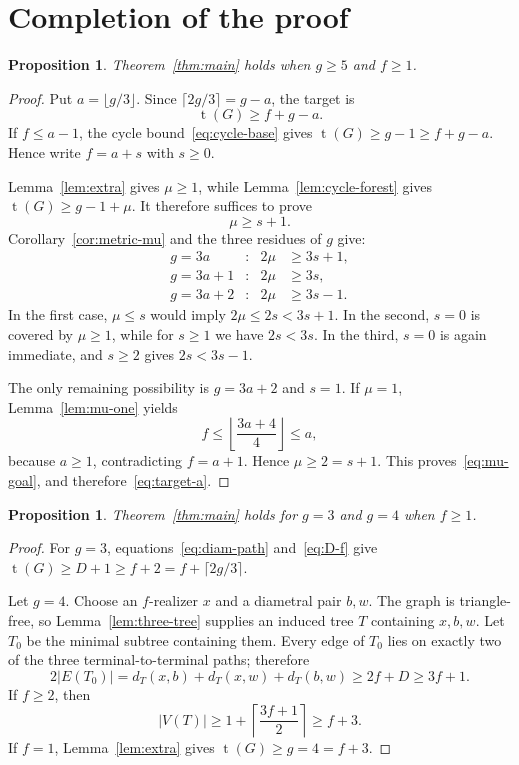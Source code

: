 \documentclass[11pt]{article}
\numberwithin{equation}{section}
\newtheorem{proposition}[theorem]{Proposition}
\theoremstyle{remark}
\newcommand{\tr}{\operatorname{t}}
\begin{document}
\section{Completion of the proof}

\begin{proposition}\label{prop:large-girth}
Theorem~\ref{thm:main} holds when $g\ge5$ and $f\ge1$.
\end{proposition}

\begin{proof}
Put $a=\lfloor g/3\rfloor$.  Since
$\lceil2g/3\rceil=g-a$, the target is
\begin{equation}\label{eq:target-a}
  \tr(G)\ge f+g-a.
\end{equation}
If $f\le a-1$, the cycle bound~\eqref{eq:cycle-base} gives
$\tr(G)\ge g-1\ge f+g-a$.  Hence write $f=a+s$ with $s\ge0$.

Lemma~\ref{lem:extra} gives $\mu\ge1$, while
Lemma~\ref{lem:cycle-forest} gives $\tr(G)\ge g-1+\mu$.  It therefore
suffices to prove
\begin{equation}\label{eq:mu-goal}
  \mu\ge s+1.
\end{equation}
Corollary~\ref{cor:metric-mu} and the three residues of $g$ give:
\begin{align*}
 g=3a   &: &2\mu&\ge3s+1,\\
 g=3a+1 &: &2\mu&\ge3s,\\
 g=3a+2 &: &2\mu&\ge3s-1.
\end{align*}
In the first case, $\mu\le s$ would imply $2\mu\le2s<3s+1$.
In the second, $s=0$ is covered by $\mu\ge1$, while for $s\ge1$ we have
$2s<3s$.  In the third, $s=0$ is again immediate, and $s\ge2$ gives
$2s<3s-1$.

The only remaining possibility is $g=3a+2$ and $s=1$.  If $\mu=1$,
Lemma~\ref{lem:mu-one} yields
\[
 f\le\left\lfloor\frac{3a+4}{4}\right\rfloor\le a,
\]
because $a\ge1$, contradicting $f=a+1$.  Hence $\mu\ge2=s+1$.
This proves~\eqref{eq:mu-goal}, and therefore~\eqref{eq:target-a}.
\end{proof}

\begin{proposition}\label{prop:small-girth}
Theorem~\ref{thm:main} holds for $g=3$ and $g=4$ when $f\ge1$.
\end{proposition}

\begin{proof}
For $g=3$, equations~\eqref{eq:diam-path} and~\eqref{eq:D-f} give
$\tr(G)\ge D+1\ge f+2=f+\lceil2g/3\rceil$.

Let $g=4$.  Choose an $f$-realizer $x$ and a diametral pair $b,w$.  The graph
is triangle-free, so Lemma~\ref{lem:three-tree} supplies an induced tree $T$
containing $x,b,w$.  Let $T_0$ be the minimal subtree containing them.  Every
edge of $T_0$ lies on exactly two of the three terminal-to-terminal paths;
therefore
\[
  2|E(T_0)|=d_T(x,b)+d_T(x,w)+d_T(b,w)
   \ge 2f+D\ge3f+1.
\]
If $f\ge2$, then
\[
 |V(T)|\ge1+\left\lceil\frac{3f+1}{2}\right\rceil\ge f+3.
\]
If $f=1$, Lemma~\ref{lem:extra} gives $\tr(G)\ge g=4=f+3$.
\end{proof}
\end{document}
